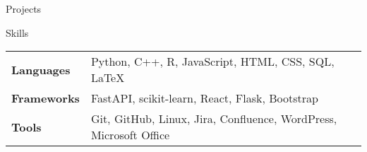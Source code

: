 \documentclass[
	10.5pt, %
]{resume} %
\begin{document}
\begin{rSection}{Projects}

\end{rSection}


\begin{rSection}{Skills}

    \renewcommand{\arraystretch}{1.2}
    \begin{tabular}{@{} >{\bfseries}p{2.2cm} p{15.8cm} @{}}
		Languages & Python, C++, R, JavaScript, HTML, CSS, SQL, LaTeX
		\\ Frameworks & FastAPI, scikit-learn, React, Flask, Bootstrap
		\\ Tools & Git, GitHub, Linux, Jira, Confluence, WordPress, Microsoft Office
	\end{tabular}

\end{rSection}
\end{document}
